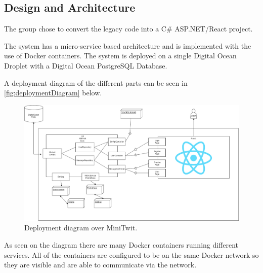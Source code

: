\subsection{Design and Architecture}

The group chose to convert the legacy code into a C\# ASP.NET/React project.

The system has a micro-service based architecture and is implemented with the use of Docker containers. The system is deployed on a single Digital Ocean Droplet with a Digital Ocean PostgreSQL Database.

A deployment diagram of the different parts can be seen in \autoref{fig:deploymentDiagram} below.

\begin{figure}[H]
    \centering
    \includegraphics[width=\textwidth]{resources/diagram.png}
    \caption{Deployment diagram over MiniTwit.}
    \label{fig:deploymentDiagram}
\end{figure}

As seen on the diagram there are many Docker containers running different services. All of the containers are configured to be on the same Docker network so they are visible and are able to communicate via the network.